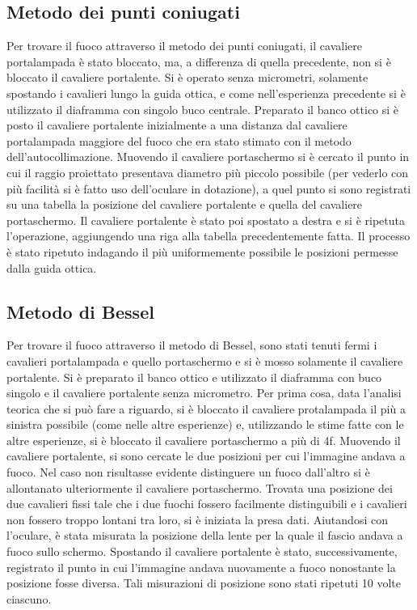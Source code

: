 \subsection{Metodo dei punti coniugati} 
Per trovare il fuoco attraverso il metodo dei punti coniugati, il 
cavaliere portalampada \`e stato bloccato, ma, a differenza di 
quella precedente, non si è bloccato il cavaliere portalente. Si è 
operato senza micrometri, solamente spostando i cavalieri lungo la 
guida ottica, e come nell'esperienza precedente si è utilizzato il 
diaframma con singolo buco centrale. Preparato il banco ottico si è 
posto il cavaliere portalente inizialmente a una distanza dal 
cavaliere portalampada maggiore del fuoco che era stato stimato con 
il metodo dell'autocollimazione. Muovendo il cavaliere portaschermo 
si è cercato il punto in cui il raggio proiettato presentava 
diametro più piccolo possibile (per vederlo con più facilità si è 
fatto uso dell'oculare in dotazione), a quel punto si sono 
registrati su una tabella la posizione del cavaliere portalente e 
quella del cavaliere portaschermo. Il cavaliere portalente è stato 
poi spostato a destra e si è ripetuta l'operazione, aggiungendo una 
riga alla tabella precedentemente fatta. Il processo è stato 
ripetuto indagando il più uniformemente possibile le posizioni 
permesse dalla guida ottica.

\subsection{Metodo di Bessel}
Per trovare il fuoco attraverso il metodo di Bessel, sono stati 
tenuti fermi i cavalieri portalampada e quello portaschermo e si è 
mosso solamente il cavaliere portalente. Si è preparato il banco 
ottico e utilizzato il diaframma con buco singolo e il cavaliere 
portalente senza micrometro. Per prima cosa, data l'analisi teorica 
che si può fare a riguardo, si è bloccato il cavaliere protalampada 
il più a sinistra possibile (come nelle altre esperienze) e, 
utilizzando le stime fatte con le altre esperienze, si è bloccato il 
cavaliere portaschermo a più di 4f. Muovendo il cavaliere 
portalente, si sono cercate le due posizioni per cui l'immagine 
andava a fuoco. Nel caso non risultasse evidente distinguere un 
fuoco dall'altro si è allontanato ulteriormente il cavaliere 
portaschermo. Trovata una posizione dei due cavalieri fissi tale che 
i due fuochi fossero facilmente distinguibili e i cavalieri non 
fossero troppo lontani tra loro, si è iniziata la presa dati. 
Aiutandosi con l'oculare, è stata misurata la posizione della lente 
per la quale il fascio andava a fuoco sullo schermo. Spostando il 
cavaliere portalente è stato, successivamente, registrato il punto 
in cui l'immagine andava nuovamente a fuoco nonostante la posizione 
fosse diversa. Tali misurazioni di posizione sono stati ripetuti 10 
volte ciascuno.


